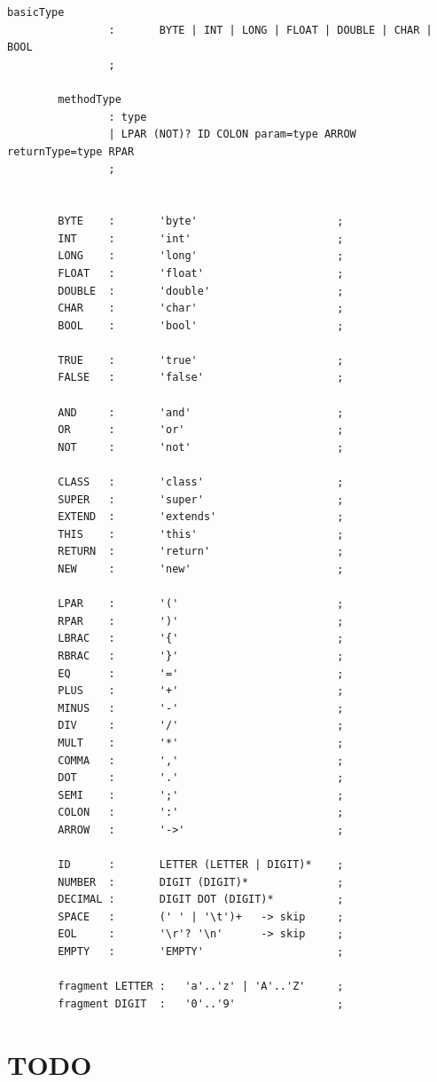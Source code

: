 \documentclass{l4proj}
\begin{document}
\begin{appendices}
\begin{lstlisting}[label={lst:sfjgram}, caption={The full ANTLR grammar for SFJ language}]
        basicType
                :       BYTE | INT | LONG | FLOAT | DOUBLE | CHAR | BOOL
                ;

        methodType
                : type
                | LPAR (NOT)? ID COLON param=type ARROW returnType=type RPAR
                ;


        BYTE    :       'byte'                      ;
        INT     :       'int'                       ;
        LONG    :       'long'                      ;
        FLOAT   :       'float'                     ;
        DOUBLE  :       'double'                    ;
        CHAR    :       'char'                      ;
        BOOL    :       'bool'                      ;

        TRUE    :       'true'                      ;
        FALSE   :       'false'                     ;

        AND     :       'and'                       ;
        OR      :       'or'                        ;
        NOT     :       'not'                       ;

        CLASS   :       'class'                     ;
        SUPER   :       'super'                     ;
        EXTEND  :       'extends'                   ;
        THIS    :       'this'                      ;
        RETURN  :       'return'                    ;
        NEW     :       'new'                       ;

        LPAR    :       '('                         ;
        RPAR    :       ')'                         ;
        LBRAC   :       '{'                         ;
        RBRAC   :       '}'                         ;
        EQ      :       '='                         ;
        PLUS    :       '+'                         ;
        MINUS   :       '-'                         ;
        DIV     :       '/'                         ;
        MULT    :       '*'                         ;
        COMMA   :       ','                         ;
        DOT     :       '.'                         ;
        SEMI    :       ';'                         ;
        COLON   :       ':'                         ;
        ARROW   :       '->'                        ;

        ID      :       LETTER (LETTER | DIGIT)*    ;
        NUMBER  :       DIGIT (DIGIT)*              ;
        DECIMAL :       DIGIT DOT (DIGIT)*          ;
        SPACE   :       (' ' | '\t')+   -> skip     ;
        EOL     :       '\r'? '\n'      -> skip     ;
        EMPTY   :       'EMPTY'                     ;

        fragment LETTER :   'a'..'z' | 'A'..'Z'     ;
        fragment DIGIT  :   '0'..'9'                ;
    \end{lstlisting}

    \chapter{TODO}

\end{appendices}





\end{document}
